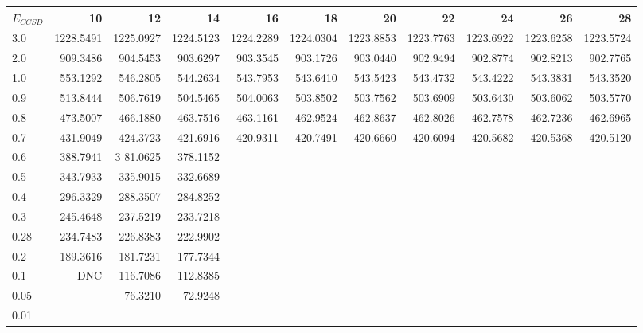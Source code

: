 \begin{landscape}
\begin{table}
\begin{center}
\begin{tabular}{l|rrrrrrrrrr}
\hline 
$E_{CCSD}$ & 10 & 12 & 14 & 16 & 18 & 20 & 22 & 24 & 26 & 28 \\
\hline \hline
3.0 & 1228.5491 & 1225.0927 & 1224.5123 & 1224.2289 & 1224.0304 & 1223.8853 & 1223.7763 & 1223.6922 & 1223.6258 & 1223.5724 \\ 
2.0 &  909.3486 &  904.5453 &  903.6297 &  903.3545 &  903.1726 &  903.0440 &  902.9494 &  902.8774 &  902.8213 &  902.7765 \\ 
1.0 &  553.1292 &  546.2805 &  544.2634 &  543.7953 &  543.6410 &  543.5423 &  543.4732 &  543.4222 &  543.3831 &  543.3520 \\ 
0.9 &  513.8444 &  506.7619 &  504.5465 &  504.0063 &  503.8502 &  503.7562 &  503.6909 &  503.6430 &  503.6062 &  503.5770 \\ 
0.8 &  473.5007 &  466.1880 &  463.7516 &  463.1161 &  462.9524 &  462.8637 &  462.8026 &  462.7578 &  462.7236 &  462.6965 \\ 
0.7 &  431.9049 &  424.3723 &  421.6916 &  420.9311 &  420.7491 &  420.6660 &  420.6094 &  420.5682 &  420.5368 &  420.5120 \\ 
0.6 &  388.7941 & 3 81.0625 &  378.1152 & \\ 
0.5 & 343.7933 & 335.9015 & 332.6689  \\ 
0.4 & 296.3329 & 288.3507 & 284.8252  \\ 
0.3 & 245.4648 & 237.5219 & 233.7218  \\ 
0.28 & 234.7483 & 226.8383 & 222.9902  \\ 
0.2 & 189.3616 & 181.7231 & 177.7344  \\ 
0.1 & DNC & 116.7086 & 112.8385  \\ 
0.05 &        & 76.3210 & 72.9248  \\ 
0.01 &        &   \\ 
\hline \hline
\end{tabular}
\end{center}
\end{table}
\end{landscape}


